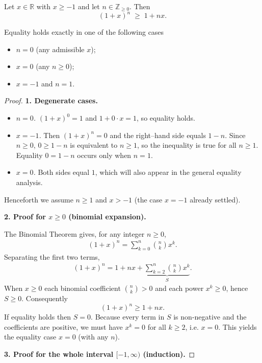 \begin{theorem}
Let $x\in\mathbb R$ with $x\ge -1$ and let $n\in\mathbb Z_{\ge 0}$. Then  
\[
(1+x)^{n}\;\ge\;1+nx .
\]

Equality holds exactly in one of the following cases  

\begin{itemize}
\item $n=0$ (any admissible $x$);
\item $x=0$ (any $n\ge 0$);
\item $x=-1$ and $n=1$.
\end{itemize}
\end{theorem}

\begin{proof}
\textbf{1. Degenerate cases.}  

\begin{itemize}
\item \emph{$n=0$.}  $(1+x)^{0}=1$ and $1+0\cdot x=1$, so equality holds.
\item \emph{$x=-1$.}  Then $(1+x)^{n}=0$ and the right–hand side equals $1-n$.  
Since $n\ge0$, $0\ge 1-n$ is equivalent to $n\ge1$, so the inequality is true for all $n\ge1$.  
Equality $0=1-n$ occurs only when $n=1$.
\item \emph{$x=0$.}  Both sides equal $1$, which will also appear in the general equality analysis.
\end{itemize}
Henceforth we assume $n\ge1$ and $x>-1$ (the case $x=-1$ already settled).

\medskip

\textbf{2. Proof for $x\ge0$ (binomial expansion).}  

The Binomial Theorem gives, for any integer $n\ge0$,
\begin{align}
(1+x)^{n}= \sum_{k=0}^{n}\binom{n}{k}x^{k}.
\end{align}
Separating the first two terms,
\begin{align}
(1+x)^{n}=1+nx+\underbrace{\sum_{k=2}^{n}\binom{n}{k}x^{k}}_{S}.
\tag{2}
\end{align}
When $x\ge0$ each binomial coefficient $\binom{n}{k}>0$ and each power $x^{k}\ge0$, hence $S\ge0$. Consequently
\[
(1+x)^{n}\ge 1+nx .
\]
If equality holds then $S=0$. Because every term in $S$ is non‑negative and the coefficients are positive, we must have $x^{k}=0$ for all $k\ge2$, i.e. $x=0$. This yields the equality case $x=0$ (with any $n$).

\medskip

\textbf{3. Proof for the whole interval $[-1,\infty)$ (induction).}  


\end{proof}
